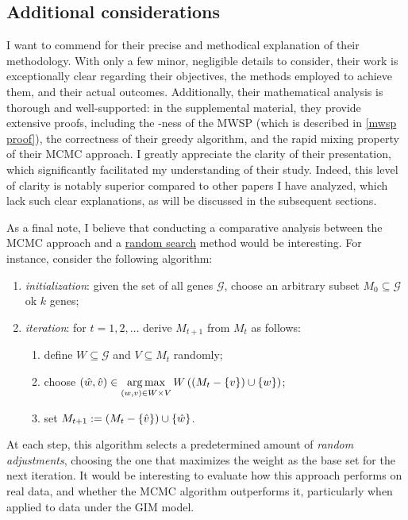 \subsection{Additional considerations}

I want to commend \textcite{dendrix} for their precise and methodical explanation of their methodology. With only a few minor, negligible details to consider, their work is exceptionally clear regarding their objectives, the methods employed to achieve them, and their actual outcomes. Additionally, their mathematical analysis is thorough and well-supported: in the supplemental material, they provide extensive proofs, including the \NPHard-ness of the MWSP (which is described in \cref{mwsp proof}), the correctness of their greedy algorithm, and the rapid mixing property of their MCMC approach. I greatly appreciate the clarity of their presentation, which significantly facilitated my understanding of their study. Indeed, this level of clarity is notably superior compared to other papers I have analyzed, which lack such clear explanations, as will be discussed in the subsequent sections.

As a final note, I believe that conducting a comparative analysis between the MCMC approach and a \href{https://en.wikipedia.org/wiki/Random_search}{random search} method would be interesting. For instance, consider the following algorithm:

\begin{enumerate}
    \item \textit{initialization}: given the set of all genes $\mathcal G$, choose an arbitrary subset $M_0 \subseteq \mathcal G$ ok $k$ genes;
    \item \textit{iteration}: for $t = 1, 2, \ldots$ derive $M_{t + 1}$ from $M_t$ as follows:

    \begin{enumerate}
        \item define $W \subseteq \mathcal G$ and $V \subseteq M_t$ randomly;
        \item choose $\displaystyle (\hat w, \hat v) \in \operatorname*{arg\,max}_{(w, v) \in W \times V}{W\left(\left(M_t - \{v\}\right) \cup \{w\}\right)}$;
        \item set $M_{t + 1} := \left(M_t - \{\hat v\}\right) \cup \{\hat w\}$.
    \end{enumerate}
\end{enumerate}

At each step, this algorithm selects a predetermined amount of \textit{random adjustments}, choosing the one that maximizes the weight as the base set for the next iteration. It would be interesting to evaluate how this approach performs on real data, and whether the MCMC algorithm outperforms it, particularly when applied to data under the GIM model.

